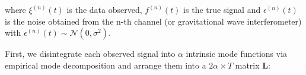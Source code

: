 \documentclass[onecolumn, groupedaddress, 10pt]{revtex4-1}
\begin{document}

where $\xi^{(n)}(t)$ is the data observed, $f^{(n)}(t)$ is the true signal and $\epsilon^{(n)}(t)$ is the noise obtained from the n-th channel (or gravitational wave interferometer) with $\epsilon^{(n)}(t) \sim \mathcal{N}(0,\sigma^2)$.

First, we disintegrate each observed signal into $\alpha$ intrinsic mode functions via empirical mode decomposition and arrange them into a $2 \alpha \times T$ matrix $\mathbf{L}$:
\end{document}
